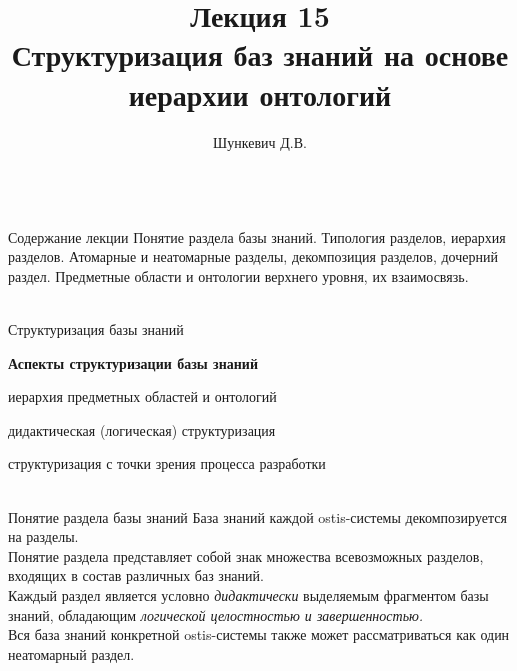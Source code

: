 \title{Лекция 15\\Структуризация баз знаний на основе иерархии онтологий}
\author[]{Шункевич Д.В.}

\begin{frame}
	\titlepage
\end{frame}

\begin{frame}{\\Содержание лекции}
	\topline
	\justifying
	Понятие раздела базы знаний. Типология разделов, иерархия разделов. Атомарные и неатомарные разделы, декомпозиция разделов, дочерний раздел. Предметные области и онтологии верхнего уровня, их взаимосвязь.
\end{frame}

\begin{frame}{\\Структуризация базы знаний}
	\begin{SCn}
		\textbf{Аспекты структуризации базы знаний}
		\begin{textitemize}
			\item  иерархия предметных областей и онтологий
			\item дидактическая (логическая) структуризация
			\item структуризация с точки зрения процесса разработки
		\end{textitemize}
	\end{SCn}
\end{frame}

\begin{frame}{\\Понятие раздела базы знаний}
	База знаний каждой ostis-системы декомпозируется на разделы.\\
	Понятие раздела представляет собой знак	множества всевозможных разделов, входящих в	состав различных баз знаний. \\ \vspace{10mm}
	Каждый раздел является условно \textit{дидактически} выделяемым	фрагментом базы знаний, обладающим \textit{логической	целостностью и завершенностью.}\\
	Вся база знаний	конкретной ostis-системы также может	рассматриваться как один неатомарный раздел.
\end{frame}

